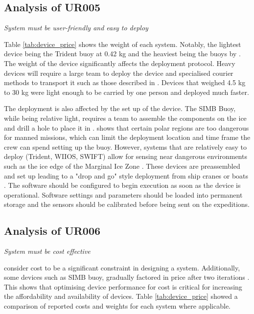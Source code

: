 \subsection{Analysis of UR005}

\textit{System must be user-friendly and easy to deploy}

Table \ref{tab:device_price} shows the weight of each system. Notably, the lightest device being the Trident buoy at 0.42 kg and the heaviest being the buoys by \textcite{doble2017robust}. The weight of the device significantly affects the deployment protocol. Heavy devices will require a large team to deploy the device and specialised courier methods to transport it such as those described in \textcite{doble2017robust}. Devices that weighed 4.5 kg to 30 kg were light enough to be carried by one person and deployed much faster.

The deployment is also affected by the set up of the device. The SIMB Buoy, while being relative light, requires a team to assemble the components on the ice and drill a hole to place it in \cite{PLANCK2019102792}. \textcite{kennicutt2016delivering} shows that certain polar regions are too dangerous for manned missions, which can limit the deployment location and time frame the crew can spend setting up the buoy. However, systems that are relatively easy to deploy (Trident, WIIOS, SWIFT) allow for sensing near dangerous environments such as the ice edge of the Marginal Ice Zone . These devices are preassembled and set up leading to a "drop and go" style deployment from ship cranes \cite{vichi2019effects,alberello2019drift} or boats \cite{rabault2019open,kohout2015device}. The software should be configured to begin execution as soon as the device is operational. Software settings and parameters should be loaded into permanent storage and the sensors should be calibrated before being sent on the expeditions.

\subsection{Analysis of UR006}

\textit{System must be cost effective}

\textcite{PLANCK2019102792,guimaraes2018surface,rabault2019open} consider cost to be a significant constraint in designing a system. Additionally, some devices such as SIMB buoy, gradually factored in price after two iterations \cite{planck2019evolution}. This shows that optimising device performance for cost is critical for increasing the affordability and availability of devices. Table \ref{tab:device_price} showed a comparison of reported costs and weights for each system where applicable.
 
